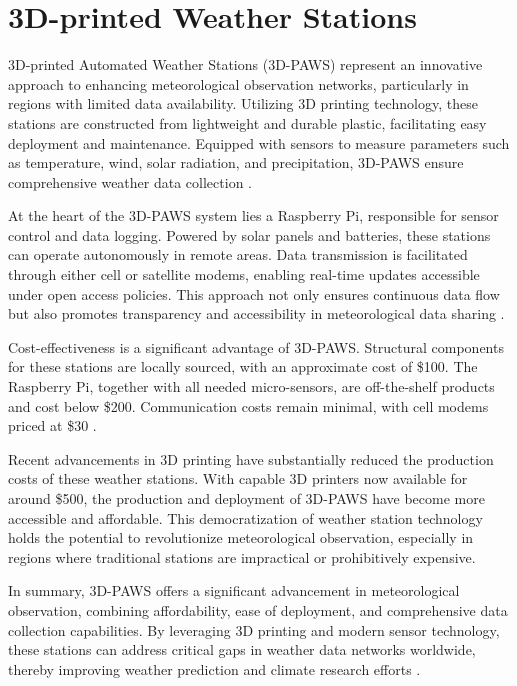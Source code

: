 \section{3D-printed Weather Stations}
\label{sec: 3d_printed_stations}

3D-printed Automated Weather Stations (3D-PAWS) represent an innovative approach to enhancing meteorological observation networks, particularly in regions with limited data availability.
Utilizing 3D printing technology, these stations are constructed from lightweight and durable plastic, facilitating easy deployment and maintenance.
Equipped with sensors to measure parameters such as temperature, wind, solar radiation, and precipitation, 3D-PAWS ensure comprehensive weather data collection \cite{mwangi2017paws}.

At the heart of the 3D-PAWS system lies a Raspberry Pi, responsible for sensor control and data logging. Powered by solar panels and batteries, these stations can operate autonomously in remote areas.
Data transmission is facilitated through either cell or satellite modems, enabling real-time updates accessible under open access policies.
This approach not only ensures continuous data flow but also promotes transparency and accessibility in meteorological data sharing \cite{mwangi2017paws}.

Cost-effectiveness is a significant advantage of 3D-PAWS. Structural components for these stations are locally sourced, with an approximate cost of \$100.
The Raspberry Pi, together with all needed micro-sensors, are off-the-shelf products and cost below \$200. Communication costs remain minimal, with cell modems priced at \$30 \cite{mwangi2017paws}.

Recent advancements in 3D printing have substantially reduced the production costs of these weather stations.
With capable 3D printers now available for around \$500, the production and deployment of 3D-PAWS have become more accessible and affordable.
This democratization of weather station technology holds the potential to revolutionize meteorological observation, especially in regions where traditional stations are impractical or prohibitively expensive.

In summary, 3D-PAWS offers a significant advancement in meteorological observation, combining affordability, ease of deployment, and comprehensive data collection capabilities.
By leveraging 3D printing and modern sensor technology, these stations can address critical gaps in weather data networks worldwide, thereby improving weather prediction and climate research efforts \cite{muita2021}.

